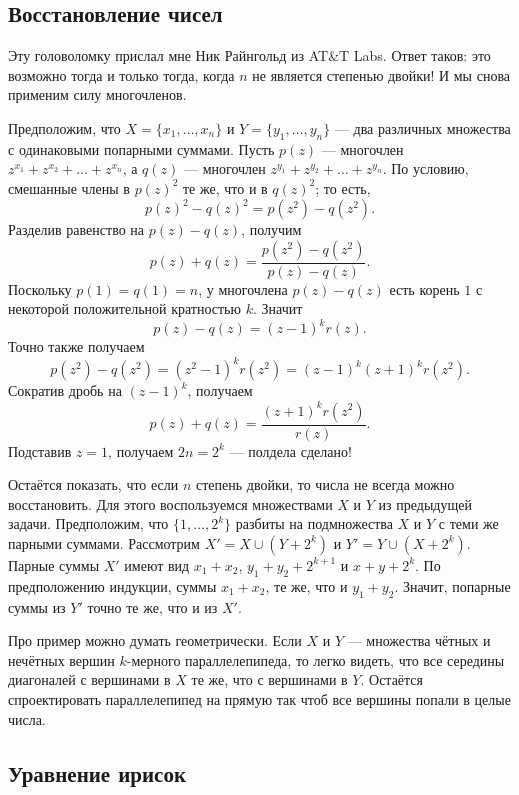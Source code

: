 \subsection*{Восстановление чисел}

Эту головоломку прислал мне Ник Райнгольд из AT\&T Labs.
Ответ таков: это возможно тогда и только тогда, когда $n$ не является степенью двойки!
И мы снова применим силу многочленов.

Предположим, что $X = \{x_1 , \dots , x_n\}$ и $Y = \{y_1 , \dots , y_n\}$ --- два различных множества с одинаковыми попарными суммами.
Пусть $p(z)$ --- многочлен $z^{x_1} + z^{x_2} + \dots + z^{x_n}$,
а $q(z)$ --- многочлен $z^{y_1} + z^{y_2} + \dots + z^{y_n}$.
По условию, смешанные члены в $p(z)^2$ те же, что и в $q(z)^2$;
то есть,
\[p(z)^2 -q(z)^2 = p(z^2 )-q(z^2).\]
Разделив равенство на $p(z) - q(z)$, получим
\[p(z) + q(z) =
\frac{p(z^2 ) - q(z^2 )}{p(z) - q(z)}.
\]
Поскольку $p(1) = q(1) = n$,
у многочлена $p(z) - q(z)$ есть корень $1$ с некоторой положительной кратностью $k$.
Значит
\[p(z) - q(z) = (z - 1)^k r(z).\]
Точно также получаем
\[p(z^2 ) - q(z^2 ) = (z^2 - 1)^k r(z^2 )= (z - 1)^k (z + 1)^k r(z^2).\]
Сократив дробь на $(z - 1)^k$, получаем
\[p(z) + q(z) =
\frac{(z + 1)^k r(z^2)}{r(z)}.
\]
Подставив $z = 1$, получаем $2n = 2^k$ --- полдела сделано!

Остаётся показать, что если $n$ степень двойки, то
числа не всегда можно восстановить.
Для этого воспользуемся множествами $X$ и $Y$ из предыдущей задачи.
Предположим, что $\{1, \dots , 2^k\}$ разбиты на подмножества $X$ и $Y$ с теми же парными суммами.
Рассмотрим $X' = X \cup (Y + 2^k)$ и $Y' = Y \cup (X + 2^k)$.
Парные суммы $X'$ имеют вид $x_1 + x_2$, $y_1 + y_2 + 2^{k+1}$ и $x + y + 2^k$.
По предположению индукции,
суммы $x_1 + x_2$, те же, что и $y_1 + y_2$.
Значит, попарные суммы из $Y'$ точно те же, что и из $X'$.

\begin{addedbytheeditors}
Про пример можно думать геометрически.
Если $X$ и $Y$ --- множества чётных и нечётных вершин $k$-мерного параллелепипеда, то легко видеть, что все середины диагоналей с вершинами в $X$ те же, что с вершинами в $Y$.
Остаётся спроектировать параллелепипед на прямую так чтоб все вершины попали в целые числа.
\end{addedbytheeditors}

\subsection*{Уравнение ирисок}

